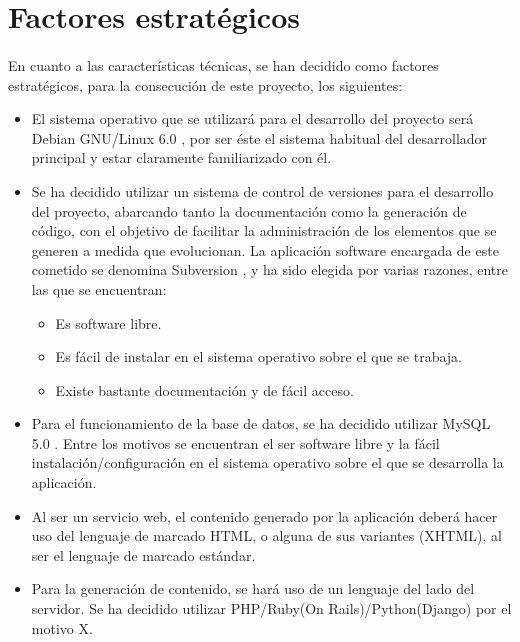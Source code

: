 \section{Factores estratégicos}\label{facEst}

\paragraph{}En cuanto a las características técnicas, se han decidido como
factores estratégicos, para la consecución de este proyecto, los siguientes:

\begin{itemize}
   \item El sistema operativo que se utilizará para el desarrollo del proyecto
   será Debian GNU/Linux 6.0 \cite{debian}, por ser éste el sistema habitual
   del desarrollador principal y estar claramente familiarizado con él.
   \item Se ha decidido utilizar un sistema de control de versiones para el
   desarrollo del proyecto, abarcando tanto la documentación como la generación
   de código, con el objetivo de facilitar la administración de los elementos
   que se generen a medida que evolucionan. La aplicación software encargada de
   este cometido se denomina Subversion \cite{subversion}, y ha sido elegida por
   varias razones, entre las que se encuentran:
   \begin{itemize}
      \item Es software libre.
      \item Es fácil de instalar en el sistema operativo sobre el que se
            trabaja.
      \item Existe bastante documentación y de fácil acceso.
   \end{itemize}
   \item Para el funcionamiento de la base de datos, se ha decidido utilizar
   MySQL 5.0 \cite{mysql}. Entre los motivos se encuentran el ser software
   libre y la fácil instalación/configuración en el sistema operativo sobre el
   que se desarrolla la aplicación.
   \item Al ser un servicio web, el contenido generado por la aplicación deberá
   hacer uso del lenguaje de marcado HTML, o alguna de sus variantes (XHTML), al
   ser el lenguaje de marcado estándar.
   \item Para la generación de contenido, se hará uso de un lenguaje del lado
   del servidor. Se ha decidido utilizar PHP/Ruby(On Rails)/Python(Django) por
   el motivo X.
\end{itemize}

